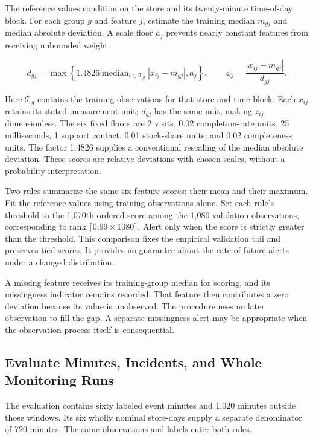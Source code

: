 \noindent \noindent The reference values condition on the store and its
twenty-minute time-of-day block. For each group \(g\) and feature \(j\),
estimate the training median \(m_{gj}\) and median absolute deviation. A
scale floor \(a_j\) prevents nearly constant features from receiving
unbounded weight:

\[
d_{gj}=\max\left\{1.4826\operatorname{median}_{i\in\mathcal T_g}
|x_{ij}-m_{gj}|,a_j\right\},\qquad
z_{ij}=\frac{|x_{ij}-m_{gj}|}{d_{gj}}.
\]

Here \(\mathcal T_g\) contains the training observations for that store
and time block. Each \(x_{ij}\) retains its stated measurement unit;
\(d_{gj}\) has the same unit, making \(z_{ij}\) dimensionless. The six
fixed floors are 2 visits, 0.02 completion-rate units, 25 milliseconds,
1 support contact, 0.01 stock-share units, and 0.02 completeness units.
The factor 1.4826 supplies a conventional rescaling of the median
absolute deviation. These scores are relative deviations with chosen
scales, without a probability interpretation.

Two rules summarize the same six feature scores: their mean and their
maximum. Fit the reference values using training observations alone. Set
each rule's threshold to the 1,070th ordered score among the 1,080
validation observations, corresponding to rank
\(\lceil0.99\times1080\rceil\). Alert only when the score is strictly
greater than the threshold. This comparison fixes the empirical
validation tail and preserves tied scores. It provides no guarantee
about the rate of future alerts under a changed distribution.

A missing feature receives its training-group median for scoring, and
its missingness indicator remains recorded. That feature then
contributes a zero deviation because its value is unobserved. The
procedure uses no later observation to fill the gap. A separate
missingness alert may be appropriate when the observation process itself
is consequential.

\hypertarget{M07-evaluate-minutes-incidents-and-whole-monitoring-runs}{%
\subsection{Evaluate Minutes, Incidents, and Whole Monitoring
Runs}\label{M07-evaluate-minutes-incidents-and-whole-monitoring-runs}}

\noindent \noindent The evaluation contains sixty labeled event minutes and 1,020
minutes outside those windows. Its six wholly nominal store-days supply
a separate denominator of 720 minutes. The same observations and labels
enter both rules.

